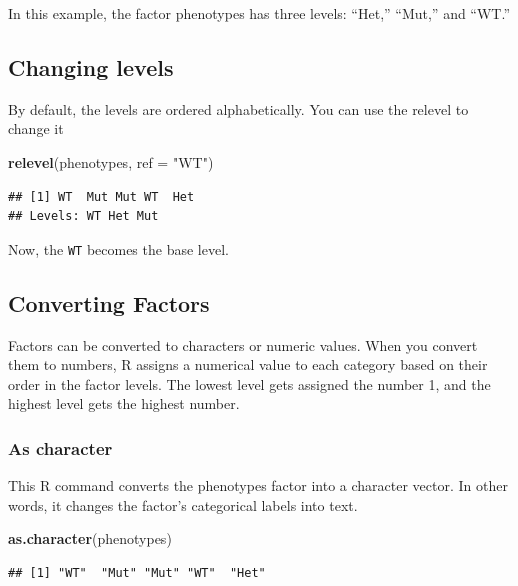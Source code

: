 \documentclass[
]{book}
\newenvironment{Shaded}{\begin{snugshade}}{\end{snugshade}}
\newcommand{\AttributeTok}[1]{\textcolor[rgb]{0.13,0.29,0.53}{#1}}
\newcommand{\FunctionTok}[1]{\textcolor[rgb]{0.13,0.29,0.53}{\textbf{#1}}}
\newcommand{\NormalTok}[1]{#1}
\newcommand{\StringTok}[1]{\textcolor[rgb]{0.31,0.60,0.02}{#1}}
\begin{document}
In this example, the factor phenotypes has three levels: ``Het,'' ``Mut,'' and ``WT.''

\hypertarget{changing-levels}{%
\subsection{Changing levels}\label{changing-levels}}

By default, the levels are ordered alphabetically. You can use the relevel to change it

\begin{Shaded}
\begin{Highlighting}[]
\FunctionTok{relevel}\NormalTok{(phenotypes, }\AttributeTok{ref =} \StringTok{"WT"}\NormalTok{)}
\end{Highlighting}
\end{Shaded}

\begin{verbatim}
## [1] WT  Mut Mut WT  Het
## Levels: WT Het Mut
\end{verbatim}

Now, the \texttt{WT} becomes the base level.

\hypertarget{converting-factors}{%
\subsection{Converting Factors}\label{converting-factors}}

Factors can be converted to characters or numeric values. When you convert them to numbers, R assigns a numerical value to each category based on their order in the factor levels. The lowest level gets assigned the number 1, and the highest level gets the highest number.

\hypertarget{as-character}{%
\subsubsection{As character}\label{as-character}}

This R command converts the phenotypes factor into a character vector. In other words, it changes the factor's categorical labels into text.

\begin{Shaded}
\begin{Highlighting}[]
\FunctionTok{as.character}\NormalTok{(phenotypes)}
\end{Highlighting}
\end{Shaded}

\begin{verbatim}
## [1] "WT"  "Mut" "Mut" "WT"  "Het"
\end{verbatim}
\end{document}
